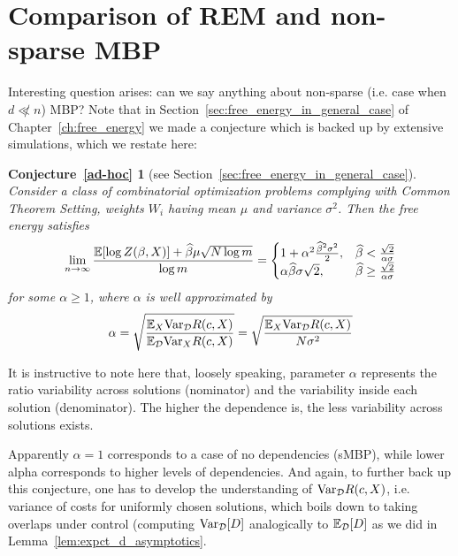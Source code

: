 \section{Comparison of REM and non-sparse MBP}
\label{sec:mbp_and_rem_how_similar}

Interesting question arises: can we say anything about non-sparse (i.e. case
when $d \not \ll n$) MBP? Note that in Section~\ref{sec:free_energy_in_general_case}
of Chapter~\ref{ch:free_energy} we made a conjecture which is backed up by
extensive simulations, which we restate here:

\newtheorem*{adhocconj}{Conjecture~\ref{ad-hoc}}
\begin{adhocconj}[see Section~\ref{sec:free_energy_in_general_case}]
Consider a class of combinatorial optimization problems complying with Common
Theorem Setting, weights $W_i$ having mean $\mu$ and variance $\sigma^2$. Then
the free energy satisfies
\begin{equation*}
    \lim_{n\to \infty} \frac{{\mathbb{E}}[\log Z(\beta, X)] +\widehat \beta \mu \sqrt{N\log m}}{\log m}
    =
    \begin{cases}
        1 + \alpha^2\frac{\widehat{\beta}^2\sigma^2}{2},
            &\widehat{\beta} < \frac{\sqrt{2}}{\alpha\sigma} \\
\alpha\widehat{\beta}\sigma\sqrt{2}, &\widehat{\beta} \geq \frac{\sqrt{2}}
{\alpha\sigma}
    \end{cases}
\end{equation*}
for some $\alpha \ge 1$,
where $\alpha$ is well approximated by
\begin{equation*}
    \alpha 
      = \sqrt{\frac{{\mathbb{E}}_X{\mathrm{Var}}_{\mathcal{D}} R(c,X)}{{\mathbb{E}}_{\mathcal{D}}{\mathrm{Var}}_X R(c,X)}} 
      = \sqrt{\frac{{\mathbb{E}}_X{\mathrm{Var}}_{\mathcal{D}} R(c,X)}{N\sigma^2}}
\end{equation*}
\end{adhocconj}

It is instructive to note here that, loosely speaking, parameter $\alpha$
represents the ratio variability across solutions (nominator) and the
variability inside each solution (denominator). The higher the dependence is, the 
less variability across solutions exists. 

Apparently $\alpha = 1$ corresponds to a case of no dependencies (sMBP), while
lower alpha corresponds to higher levels of dependencies. And again, to further
back up this conjecture, one has to develop the understanding of
${\mathrm{Var}}_{\mathcal{D}} R(c, X)$, i.e. variance of costs for uniformly chosen
solutions, which boils down to taking overlaps under control (computing
${\mathrm{Var}}_\mathcal{D} [D]$ analogically to $\mathbb{E}_\mathcal{D}[D]$ as we did in
Lemma~\ref{lem:expct_d_asymptotics}.

